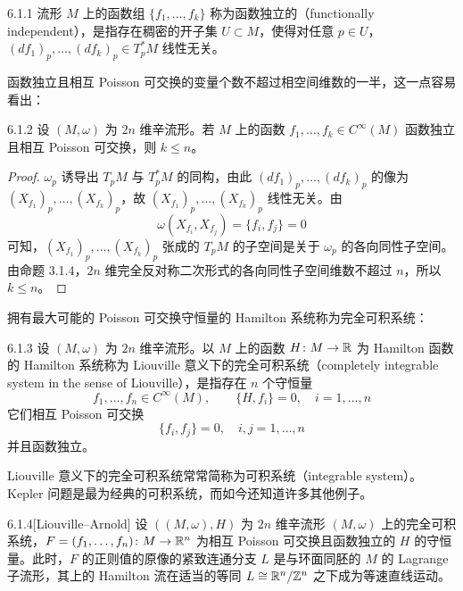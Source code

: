 \begin{definition}{6.1.1}
流形 $M$ 上的函数组 $\{f_1,\dots,f_k\}$ 称为函数独立的（functionally independent），是指存在稠密的开子集 $U\subset M$，使得对任意 $p\in U$，$(df_1)_p,\dots,(df_k)_p\in T_p^*M$ 线性无关。
\end{definition}

函数独立且相互 Poisson 可交换的变量个数不超过相空间维数的一半，这一点容易看出：

\begin{lemma*}{6.1.2}
设 $(M,\omega)$ 为 $2n$ 维辛流形。若 $M$ 上的函数 $f_1,\dots,f_k\in C^\infty(M)$ 函数独立且相互 Poisson 可交换，则 $k\le n$。
\end{lemma*}

\begin{proof}
$\omega_p$ 诱导出 $T_pM$ 与 $T_p^*M$ 的同构，由此 $(df_1)_p,\dots,(df_k)_p$ 的像为 $(X_{f_1})_p,\dots,(X_{f_k})_p$，故 $(X_{f_1})_p,\dots,(X_{f_k})_p$ 线性无关。由
\begin{equation}
  \omega(X_{f_i},X_{f_j})=\{f_i,f_j\}=0
  \tag{6.1.2}
\end{equation}
可知，$(X_{f_1})_p,\dots,(X_{f_k})_p$ 张成的 $T_pM$ 的子空间是关于 $\omega_p$ 的各向同性子空间。由命题 3.1.4，$2n$ 维完全反对称二次形式的各向同性子空间维数不超过 $n$，所以 $k\le n$。
\end{proof}

拥有最大可能的 Poisson 可交换守恒量的 Hamilton 系统称为完全可积系统：

\begin{definition}{6.1.3}
设 $(M,\omega)$ 为 $2n$ 维辛流形。以 $M$ 上的函数 $H\colon M\to\mathbb{R}$ 为 Hamilton 函数的 Hamilton 系统称为 Liouville 意义下的完全可积系统（completely integrable system in the sense of Liouville），是指存在 $n$ 个守恒量
\begin{equation}
  f_1,\dots,f_n\in C^\infty(M),\qquad \{H,f_i\}=0,\quad i=1,\dots,n
  \tag{6.1.3}
\end{equation}
它们相互 Poisson 可交换
\begin{equation}
  \{f_i,f_j\}=0,\quad i,j=1,\dots,n
  \tag{6.1.4}
\end{equation}
并且函数独立。
\end{definition}

Liouville 意义下的完全可积系统常常简称为可积系统（integrable system）。Kepler 问题是最为经典的可积系统，而如今还知道许多其他例子。

\begin{theorem}{6.1.4}[Liouville--Arnold]
设 $((M,\omega),H)$ 为 $2n$ 维辛流形 $(M,\omega)$ 上的完全可积系统，$F=(f_1,\dots,f_n)\colon M\to\mathbb{R}^n$ 为相互 Poisson 可交换且函数独立的 $H$ 的守恒量。此时，$F$ 的正则值的原像的紧致连通分支 $L$ 是与环面同胚的 $M$ 的 Lagrange 子流形，其上的 Hamilton 流在适当的等同 $L\cong\mathbb{R}^n/\mathbb{Z}^n$ 之下成为等速直线运动。
\end{theorem}

